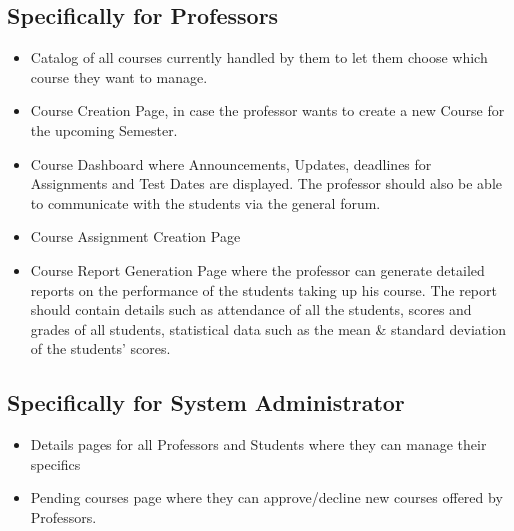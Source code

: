 \documentclass[12pt, a4]{report}
\begin{document}
\subsection{Specifically for Professors}
\begin{itemize}
    \item Catalog of all courses currently handled by them to let them choose which course they want to manage.
    \item Course Creation Page, in case the professor wants to create a new Course for the upcoming Semester.
    \item Course Dashboard where Announcements, Updates, deadlines for Assignments and Test Dates are displayed. The professor should also be able to communicate with the students via the general forum.
    \item Course Assignment Creation Page
    \item Course Report Generation Page where the professor can generate detailed reports on the performance of the students taking up his course. The report should contain details such as attendance of all the students, scores and grades of all students, statistical data such as the mean \& standard deviation of the students' scores.
\end{itemize}

\subsection{Specifically for System Administrator}
\begin{itemize}
    \item Details pages for all Professors and Students where they can manage their specifics
    \item Pending courses page where they can approve/decline new courses offered by Professors.
\end{itemize}


\newpage
\end{document}
